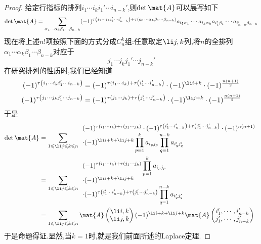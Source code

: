 \documentclass{ctexart}
\begin{document}
\begin{proof}
    给定行指标的排列$i_1\cdots i_ki_1'\cdots i_{n-k}'$,则$\det\mat{A}$可以展写如下
    \[\det\mat{A}=\sum_{\alpha_1\cdots\alpha_k\beta_1\cdots\beta_{n-k}}(-1)^{\tau\left(i_1\cdots i_ki_1'\cdots i_{n-k}'\right)+\tau\left(\alpha_1\cdots\alpha_k\beta_1\cdots\beta_{n-k}\right)}a_{i_1\alpha_1}\cdots a_{i_k\alpha_k}a_{i_1'\beta_1}\cdots a_{i_{n-k}'\beta_{n-k}}\]
    现在将上述$n!$项按照下面的方式分成$C_n^k$组:任意取定$\li j,k$列,将$n$的全排列$\alpha_1\cdots\alpha_k\beta_1\cdots\beta_{n-k}$对应于
    \[j_1\cdots j_kj_1'\cdots j_{n-k}'\]
    在研究排列的性质时,我们已经知道
    \[(-1)^{\tau\left(i_1\cdots i_ki_1'\cdots i_{n-k}\right)}=(-1)^{\tau\left(i_1\cdots i_k\right)+\tau\left(i_1'\cdots i_{n-k}'\right)}\cdot(-1)^{\li i+k}\cdot(-1)^{\frac{n(n+1)}{2}}\]
    \[(-1)^{\tau\left(j_1\cdots j_kj_1'\cdots j_{n-k}\right)}=(-1)^{\tau\left(j_1\cdots j_k\right)+\tau\left(j_1'\cdots j_{n-k}'\right)}\cdot(-1)^{\li j+k}\cdot(-1)^{\frac{n(n+1)}{2}}\]
    于是
    \[\begin{aligned}
        \det\mat{A}
        &=\sum_{1\leqslant\li j\leqslant k\leqslant n}\begin{array}{l}
            (-1)^{\tau\left(i_1\cdots i_k\right)+\tau\left(j_1\cdots j_k\right)}\cdot(-1)^{\tau\left(i_1'\cdots i_{n-k}'\right)+\tau\left(j_1'\cdots j_{n-k}'\right)}\cdot(-1)^{n(n+1)}\\
            \displaystyle\cdot(-1)^{\li i+k+\li j+k}\prod_{p=1}^{k}a_{i_pj_p}\prod_{q=1}^{n-k}a_{i_q'j_q'}
        \end{array}\\
        &= \sum_{1\leqslant\li j\leqslant k\leqslant n}\begin{array}{l}
            \displaystyle(-1)^{\tau\left(i_1\cdots i_k\right)+\tau\left(j_1\cdots j_k\right)}\prod_{p=1}^{k}a_{i_pj_p}\\
            \cdot(-1)^{\li i+k+\li j+k}\\
            \displaystyle\cdot(-1)^{\tau\left(i_1'\cdots i_{n-k}'\right)+\tau\left(j_1'\cdots j_{n-k}'\right)}\prod_{q=1}^{n-k}a_{i_q'j_q'}
        \end{array} \\
        &= \sum_{1\leqslant\li j\leqslant k\leqslant n}\mat{A}\begin{pmatrix}
            \li i,k\\\li j,k
        \end{pmatrix}(-1)^{\li i+k+\li j+k}\mat{A}\begin{pmatrix}
            i_1',\cdots,i_{n-k}'\\j_1',\cdots,j_{n-k}'
        \end{pmatrix}
    \end{aligned}\]
    于是命题得证.显然,当$k=1$时,就是我们前面所述的Laplace定理.
\end{proof}
\end{document}
